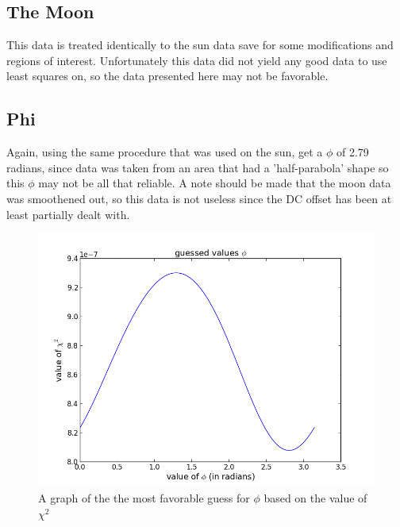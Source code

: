\documentclass[12 pt]{article}
\begin{document}
\subsection*{The Moon}
This data is treated identically to the sun data save for some
modifications and regions of interest. Unfortunately this data did not
yield any good data to use least squares on, so the data presented
here may not be favorable.

\subsection*{Phi}
Again, using the same procedure that was used on the sun,  get a $\phi$
of 2.79 radians,  since data was taken from an area that had a
'half-parabola' shape so this $\phi$ may not be all that reliable. A
note should be made that the moon data was smoothened out, so this data
is not useless since the DC offset has been at least partially dealt
with. 
\begin{figure}[H]
\centering
\includegraphics[scale=0.5]{moonphi.png}
\caption{A graph of the the most favorable guess for $\phi$ based on the
value of $\chi^2$}
\label{moonphi}
\end{figure}
\end{document}

